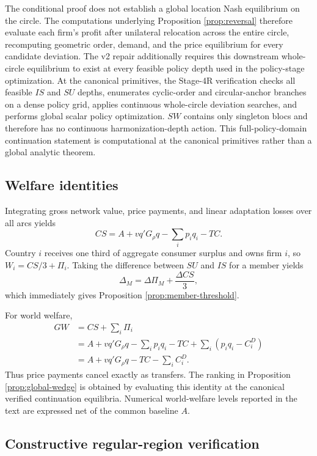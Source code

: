 The conditional proof does not establish a global location Nash equilibrium on the circle. The computations underlying Proposition \ref{prop:reversal} therefore evaluate each firm's profit after unilateral relocation across the entire circle, recomputing geometric order, demand, and the price equilibrium for every candidate deviation. The v2 repair additionally requires this downstream whole-circle equilibrium to exist at every feasible policy depth used in the policy-stage optimization. At the canonical primitives, the Stage-4R verification checks all feasible $IS$ and $SU$ depths, enumerates cyclic-order and circular-anchor branches on a dense policy grid, applies continuous whole-circle deviation searches, and performs global scalar policy optimization. $SW$ contains only singleton blocs and therefore has no continuous harmonization-depth action. This full-policy-domain continuation statement is computational at the canonical primitives rather than a global analytic theorem.

\subsection{Welfare identities}

Integrating gross network value, price payments, and linear adaptation losses over all arcs yields
\[
CS=A+vq'G_\rho q-\sum_i p_iq_i-TC.
\]
Country $i$ receives one third of aggregate consumer surplus and owns firm $i$, so $W_i=CS/3+\Pi_i$. Taking the difference between $SU$ and $IS$ for a member yields
\[
\Delta_M=\Delta\Pi_M+\frac{\Delta CS}{3},
\]
which immediately gives Proposition \ref{prop:member-threshold}.

For world welfare,
\begin{align*}
GW
&=CS+\sum_i\Pi_i\\
&=A+vq'G_\rho q-\sum_i p_iq_i-TC
  +\sum_i(p_iq_i-C_i^D)\\
&=A+vq'G_\rho q-TC-\sum_iC_i^D.
\end{align*}
Thus price payments cancel exactly as transfers. The ranking in Proposition \ref{prop:global-wedge} is obtained by evaluating this identity at the canonical verified continuation equilibria. Numerical world-welfare levels reported in the text are expressed net of the common baseline $A$.

\subsection{Constructive regular-region verification}

